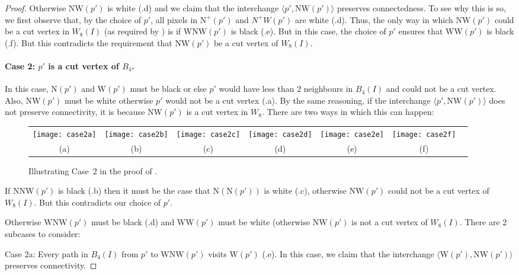 \documentclass[lotsofwhite,charterfonts]{patmorin}
\newcommand{\N}{\mathrm{N}}
\newcommand{\W}{\mathrm{W}}
\newcommand{\NW}{\mathrm{NW}}
\newcommand{\ic}[2]{\langle #1,#2 \rangle}
\begin{document}
\begin{proof}
Otherwise $\NW(p')$ is white (.d) and we claim that
the interchange $\ic{p'}{\NW(p')}$ preserves connectedness.  To see
why this is so, we first observe that, by the choice of $p'$, all
pixels in $\N^+(p')$ and $N^+W(p')$ are white (.d).
Thus, the only way in which $\NW(p')$ could be a cut vertex in $W_8(I)$
(as required by ) is if $\W\NW(p')$ is black
(.e). But in this case, the choice of $p'$ ensures
that $\W\W(p')$ is black (.f).  But this contradicts
the requirement that $\NW(p')$ be a cut vertex of $W_8(I)$.

\paragraph{Case 2: $p'$ is a cut vertex of $B_4$.} In this case,
$\N(p')$ and $\W(p')$ must be black or else $p'$ would have less than
2 neighbours in $B_4(I)$ and could not be a cut vertex.  Also,
$\NW(p')$ must be white otherwise $p'$ would not be a cut vertex
(.a). By the same reasoning, if the interchange
$\ic{p'}{\NW(p')}$ does not preserve connectivity, it is because
$\NW(p')$ is a cut vertex in $W_8$.  There are two ways in which this
can happen:

\begin{figure}
\begin{center}
\begin{tabular}{ccccccc}
\texttt{[image: case2a]} & 
\texttt{[image: case2b]} & 
\texttt{[image: case2c]} & 
\texttt{[image: case2d]} & 
\texttt{[image: case2e]} & 
\texttt{[image: case2f]} \\
(a) & (b) & (c) & (d) & (e) & (f)
\end{tabular}
\end{center}
\caption{Illustrating Case~2 in the proof of .}
\end{figure}

If $\N\NW(p')$ is black (.b) then it must be the case
that $\N(\N(p'))$ is white (.c), otherwise $\NW(p')$
could not be a cut vertex of $W_8(I)$.  But this contradicts our
choice of $p'$.

Otherwise $\W\NW(p')$ must be black (.d) and
$\W\W(p')$ must be white (otherwise $\NW(p')$ is not a cut vertex of
$W_8(I)$.  There are 2 subcases to consider:

\noindent Case 2a: Every path in $B_4(I)$ from $p'$ to $\W\NW(p')$
visits $\W(p')$ (.e).  In this case, we claim that
the interchange $\ic{\W(p')}{\NW(p')}$ preserves connectivity.  


\end{proof}
\end{document}

